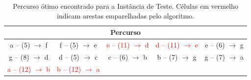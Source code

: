 \begin{table}[H]
    \centering
    \scriptsize
    \begin{tabular}{|c|c|c|c|c|}
        \hline
        \multicolumn{5}{|c|}{Percurso} \\ \hline
    a -- (5) $\rightarrow$ f & f -- (5) $\rightarrow$ e & \textcolor{red}{e -- (11) $\rightarrow$ d} & \textcolor{red}{d -- (11) $\rightarrow$ e} & e -- (6) $\rightarrow$ g \\
    g -- (8) $\rightarrow$ d & d -- (5) $\rightarrow$ c & c -- (6) $\rightarrow$ b & b -- (7) $\rightarrow$ g & g -- (7) $\rightarrow$ a \\
    \textcolor{red}{a -- (12) $\rightarrow$ b} & \textcolor{red}{b -- (12) $\rightarrow$ a} &   &   &   \\
        \hline
    \end{tabular}
    \caption{Percurso ótimo encontrado para a Instância de Teste. Células em vermelho indicam arestas emparelhadas pelo algoritmo.}
    \label{tab:percurso_aula}
\end{table}
